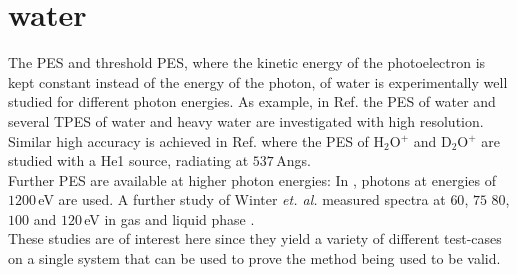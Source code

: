 \section{water}
The PES and threshold PES, where the kinetic energy of the photoelectron is kept constant instead of the energy of the photon, of water is experimentally well studied 
for different photon energies.
As example, in Ref. \cite{waterTPE} the PES of water and several TPES of water and heavy water are investigated with high resolution.\\
Similar high accuracy is achieved in Ref. \cite{waterHePES} where the PES of H$_2$O$^+$ and D$_2$O$^+$ are studied with a He1 source, radiating at $537\,$Angs.\\
Further PES are available at higher photon energies:
In \cite{water1200}, photons at energies of $1200\,$eV are used.
A further study of Winter \textit{et. al.} measured spectra at $60$, $75$ $80$, $100$ and $120\,$eV in gas and liquid phase \cite{winterWater}.\\
These studies are of interest here since they yield a variety of different test-cases on a single system that can be used to prove the method being used to be valid.
